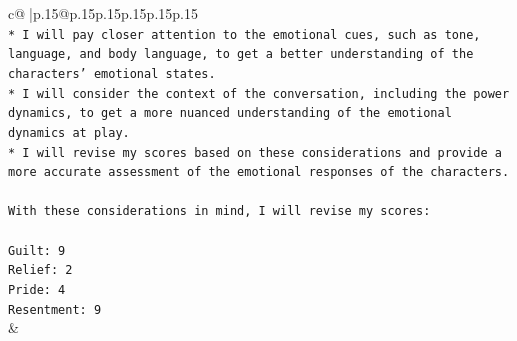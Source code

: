 \documentclass{article}
\begin{document}
{\begin{supertabular}{c@{$\;$}|p{.15\linewidth}@{}p{.15\linewidth}p{.15\linewidth}p{.15\linewidth}p{.15\linewidth}p{.15\linewidth}}
{{{\\ 
\texttt{* I will pay closer attention to the emotional cues, such as tone, language, and body language, to get a better understanding of the characters' emotional states.} \\
\texttt{* I will consider the context of the conversation, including the power dynamics, to get a more nuanced understanding of the emotional dynamics at play.} \\
\texttt{* I will revise my scores based on these considerations and provide a more accurate assessment of the emotional responses of the characters.} \\
\\ 
\texttt{With these considerations in mind, I will revise my scores:} \\
\\ 
\texttt{Guilt: 9} \\
\texttt{Relief: 2} \\
\texttt{Pride: 4} \\
\texttt{Resentment: 9} \\
            }
        }
    }
    & \\ \\

\end{supertabular}
}
\end{document}
